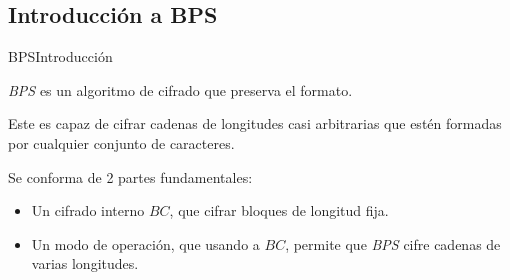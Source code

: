%
%

\subsection{Introducción a BPS}

\begin{frame}{BPS}{Introducción}

  \textit{BPS} es un algoritmo de cifrado que preserva el formato.
  
  Este es capaz de cifrar cadenas de longitudes casi arbitrarias que estén 
  formadas por cualquier conjunto de caracteres.
  
  Se conforma de 2 partes fundamentales:

  \begin{itemize}
    \item Un cifrado interno $BC$, que cifrar bloques de longitud fija.
    \item Un modo de operación, que usando a $BC$, permite que \textit{BPS} 
    cifre cadenas de varias longitudes.
  \end{itemize}
  
\end{frame}

